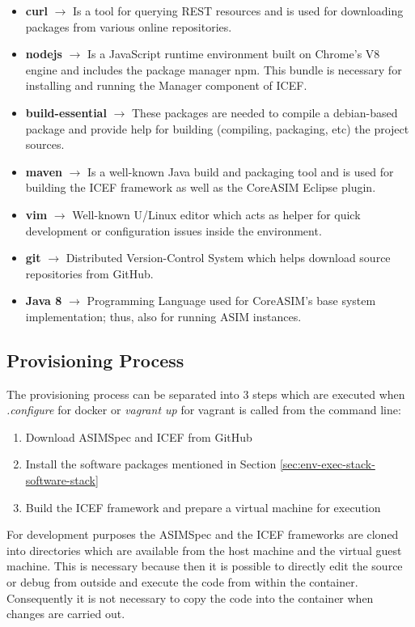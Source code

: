 \begin{itemize}
	\item \textbf{curl} $\rightarrow$ Is a tool for querying REST resources and is used for downloading packages from various online repositories.
	\item \textbf{nodejs} $\rightarrow$ Is a JavaScript runtime environment built on Chrome's V8 engine and includes the package manager npm. This bundle is necessary for installing and running the Manager component of ICEF.
	\item \textbf{build-essential} $\rightarrow$ These packages are needed to compile a debian-based package and provide help for building (compiling, packaging, etc) the project sources.
	\item \textbf{maven} $\rightarrow$ Is a well-known Java build and packaging tool and is used for building the ICEF framework as well as the CoreASIM Eclipse plugin.
	\item \textbf{vim} $\rightarrow$ Well-known U/Linux editor which acts as helper for quick development or configuration issues inside the environment.
	\item \textbf{git} $\rightarrow$ Distributed Version-Control System which helps download source repositories from GitHub.
	\item \textbf{Java 8} $\rightarrow$ Programming Language used for CoreASIM's base system implementation; thus, also for running ASIM instances.
\end{itemize}

\subsection{Provisioning Process}

The provisioning process can be separated into 3 steps which are executed when \textit{.\/configure} for docker or \textit{vagrant up} for vagrant is called from the command line:

\begin{enumerate}
	\item Download ASIMSpec and ICEF from GitHub
	\item Install the software packages mentioned in Section \ref{sec:env-exec-stack-software-stack}
	\item Build the ICEF framework and prepare a virtual machine for execution
\end{enumerate}

For development purposes the ASIMSpec and the ICEF frameworks are cloned into directories which are available from the host machine and the virtual guest machine. This is necessary because then it is possible to directly edit the source or debug from outside and execute the code from within the container. Consequently it is not necessary to copy the code into the container when changes are carried out.

